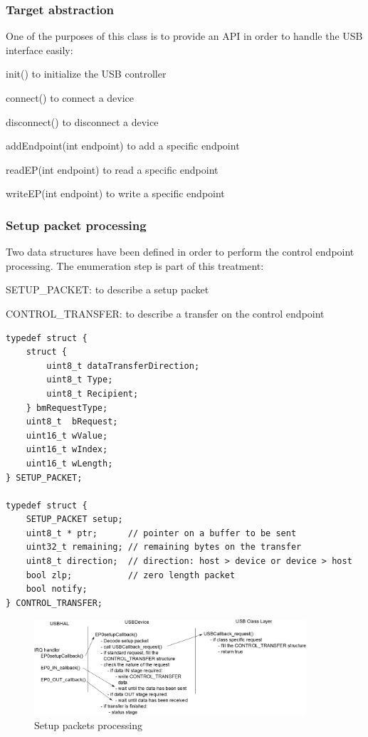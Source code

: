 \documentclass[pdftex,10pt,a4paper]{report}
\newenvironment{packed_item}{
\begin{itemize}
  \setlength{\itemsep}{1pt}
  \setlength{\parskip}{0pt}
  \setlength{\parsep}{0pt}
}{\end{itemize}}
\begin{document}
\subsubsection{Target abstraction}
One of the purposes of this class is to provide an API in order to handle the USB interface easily:
\begin{packed_item}
	\item init() to initialize the USB controller
	\item connect() to connect a device
	\item disconnect() to disconnect a device
	\item addEndpoint(int endpoint) to add a specific endpoint
	\item readEP(int endpoint) to read a specific endpoint
	\item writeEP(int endpoint) to write a specific endpoint 
\end{packed_item}

\subsubsection{Setup packet processing}
Two data structures have been defined in order to perform the control endpoint processing. The enumeration step is part of this treatment:
\begin{packed_item}
	\item SETUP\_PACKET: to describe a setup packet
	\item CONTROL\_TRANSFER: to describe a transfer on the control endpoint
\end{packed_item}


\begin{lstlisting}[label=Data structures for control endpoint processing,caption=Data structures for control endpoint processing]
typedef struct {
    struct {
        uint8_t dataTransferDirection;
        uint8_t Type;
        uint8_t Recipient;
    } bmRequestType;
    uint8_t  bRequest;
    uint16_t wValue;
    uint16_t wIndex;
    uint16_t wLength;
} SETUP_PACKET;

typedef struct {
    SETUP_PACKET setup;
    uint8_t * ptr;      // pointer on a buffer to be sent
    uint32_t remaining; // remaining bytes on the transfer
    uint8_t direction;  // direction: host > device or device > host
    bool zlp;           // zero length packet
    bool notify;
} CONTROL_TRANSFER;
\end{lstlisting}

\begin{figure}[h!]
		\centering
		\includegraphics[width=0.9\textwidth]{./setup_packets.jpg}
		\caption{Setup packets processing}
		\label{Setup packets processing}
\end{figure}
\end{document}
